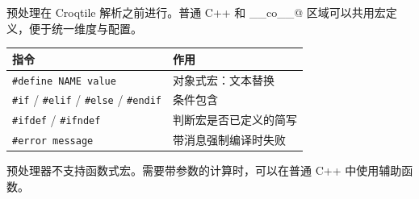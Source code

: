 预处理在 Croqtile 解析之前进行。普通 C++ 和 \co@__co__@ 区域可以共用宏定义，便于统一维度与配置。

\begin{table}[htbp]\centering\small
\begin{tabularx}{\linewidth}{@{}lX@{}}
\toprule
指令 & 作用 \\
\midrule
\texttt{\#define NAME value} & 对象式宏：文本替换 \\
\texttt{\#if} / \texttt{\#elif} / \texttt{\#else} / \texttt{\#endif} & 条件包含 \\
\texttt{\#ifdef} / \texttt{\#ifndef} & 判断宏是否已定义的简写 \\
\texttt{\#error message} & 带消息强制编译时失败 \\
\bottomrule
\end{tabularx}
\end{table}

预处理器不支持函数式宏。需要带参数的计算时，可以在普通 C++ 中使用辅助函数。
